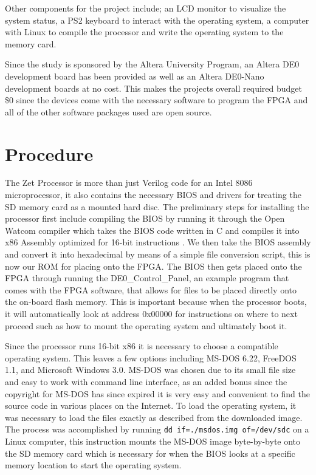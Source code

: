 \documentclass[11pt,peerreview, onecolumn]{IEEEtran}
\begin{document}
Other components for the project include; an LCD monitor to visualize the system status, a PS2 keyboard to interact with the operating system, a computer with Linux to compile the processor and write the operating system to the memory card.

Since the study is sponsored by the Altera University Program, an Altera DE0 development board has been provided as well as an Altera DE0-Nano development boards at no cost. This makes the projects overall required budget \$0 since the devices come with the necessary software to program the FPGA and all of the other software packages used are open source.

\section{Procedure}
The Zet Processor is more than just Verilog code for an Intel 8086 microprocessor, it also contains the necessary BIOS and drivers for treating the SD memory card as a mounted hard disc. The preliminary steps for installing the processor first include compiling the BIOS by running it through the Open Watcom compiler which takes the BIOS code written in C and compiles it into x86 Assembly optimized for 16-bit instructions \cite{Watcom}. We then take the BIOS assembly and convert it into hexadecimal by means of a simple file conversion script, this is now our ROM for placing onto the FPGA. The BIOS then gets placed onto the FPGA through running the DE0\_Control\_Panel, an example program that comes with the FPGA software, that allows for files to be placed directly onto the on-board flash memory. This is important because when the processor boots, it will automatically look at address 0x00000 for instructions on where to next proceed such as how to mount the operating system and ultimately boot it. 

Since the processor runs 16-bit x86 it is necessary to choose a compatible operating system. This leaves a few options including MS-DOS 6.22, FreeDOS 1.1, and Microsoft Windows 3.0. MS-DOS was chosen due to its small file size and easy to work with command line interface, as an added bonus since the copyright for MS-DOS has since expired it is very easy and convenient to find the source code in various places on the Internet. To load the operating system, it was necessary to load the files exactly as described from the downloaded image. The process was accomplished by running {\tt dd if=./msdos.img of=/dev/sdc} on a Linux computer, this instruction mounts the MS-DOS image byte-by-byte onto the SD memory card which is necessary for when the BIOS looks at a specific memory location to start the operating system.
\end{document}
